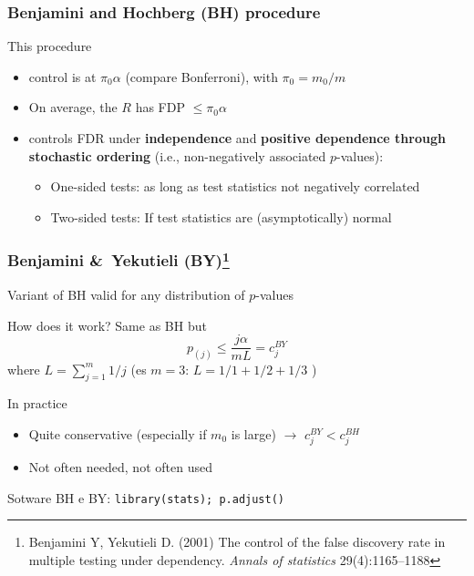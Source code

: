 \documentclass[xcolor={pdftex,dvipsnames,table}]{beamer}
\newcommand{\rbf}[1]{\textcolor{redUnipd}{ #1}}
\newcommand{\bb}[1]{\begin{block}{#1}}
\newcommand{\eb}{\end{block}}
\newcommand{\bi}{\begin {itemize}}
\newcommand{\ei}{\end{itemize}}
\newcommand{\bfr}[1]{\begin{frame} \frametitle{#1}}
\begin{document}
\begin{frame}
\frametitle{Benjamini and Hochberg (BH) procedure}

This procedure 

\begin{itemize}
    \item control is at $\pi_0\alpha$ (compare Bonferroni), with $\pi_0=m_0/m$
    \item  On average, the $R$ has FDP $\leq\pi_0\alpha$
    \item controls FDR under \textbf{independence} and \textbf{positive dependence through stochastic ordering} (i.e.,  non-negatively associated $p$-values):
  \begin{itemize}
      \item \rbf{One-sided tests}: as long as test statistics not negatively correlated
      \item \rbf{Two-sided tests}: If test statistics are (asymptotically) normal
  \end{itemize}
\end{itemize}
    
\end{frame}


\bfr{Benjamini \&\ Yekutieli (BY)\footnote{Benjamini Y, Yekutieli D. (2001) The control of the false discovery rate in multiple testing under dependency. {\it Annals of statistics} 29(4):1165--1188}}
Variant of BH valid for any distribution of $p$-values
  \bb{How does it work?}
Same as BH but 
\begin{equation*}
    p_{(j)} \le \dfrac{j \alpha}{m L} = c_j^{BY}
\end{equation*}
where $L=\sum_{j=1}^{m} 1/j$  (es $m=3$: $L= 1/1+1/2+1/3$ )
  \eb
  \bb{In practice}
    \bi
      \item Quite conservative (especially if $m_0$ is large) $\rightarrow$ $c_j^{BY} < c_j^{BH}$
      \item Not often needed, not often used
    \ei
  \eb
\bb{Sotware}
BH  e BY: {\tt library(stats); p.adjust()}
\eb

\end{frame}
\end{document}
